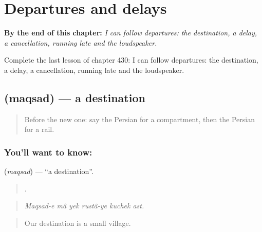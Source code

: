
\chapter{Departures and delays}
\label{ch:fa-departures-and-delays}

\begin{chapteropening}
\textbf{By the end of this chapter:} \emph{I can follow departures: the destination, a delay, a cancellation, running late and the loudspeaker.}

Complete the last lesson of chapter 430: I can follow departures: the destination, a delay, a cancellation, running late and the loudspeaker.
\end{chapteropening}

\section[\texorpdfstring{\fa{مقصد} (maqsad)}{مقصد (maqsad)}]{ (maqsad) — a destination}

\label{lesson:FA-C430-maqsad}



\begin{quote}
Before the new one: say the Persian for a compartment, then the Persian for a rail.
\end{quote}

\subsection*{You'll want to know: }
\textbf{} (\emph{maqsad}) — \textquotedblleft{}a destination\textquotedblright{}.

\begin{quote}
     .
\end{quote}

\begin{quote}
\emph{Maqsad-e mâ yek rustâ-ye kuchek ast.}
\end{quote}

\begin{quote}
Our destination is a small village.
\end{quote}

